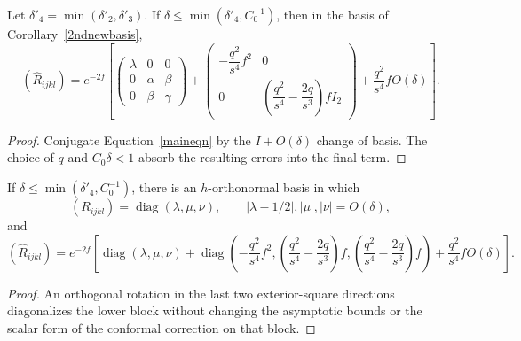 \begin{lemma}
\label{lem:rhat-matrix-adapted-basis}
\label{Rhatmatrix}
Let $\delta'_4=\min(\delta'_2,\delta'_3)$. If
$\delta\leq\min(\delta'_4,C_0^{-1})$, then in the basis of
Corollary~\ref{2ndnewbasis},
\[
(\widehat R_{ijkl})=e^{-2f}\left[
\begin{pmatrix}\lambda&0&0\\0&\alpha&\beta\\0&\beta&\gamma\end{pmatrix}
+\begin{pmatrix}
-\dfrac{q^2}{s^4}f^2&0\\
0&\left(\dfrac{q^2}{s^4}-\dfrac{2q}{s^3}\right)fI_2
\end{pmatrix}
+\frac{q^2}{s^4}fO(\delta)\right].
\]
\end{lemma}

\begin{proof}
\sketch
{}
Conjugate Equation~\eqref{maineqn} by the $I+O(\delta)$ change of basis.
The choice of $q$ and $C_0\delta<1$ absorb the resulting errors into the final
term.
\end{proof}

\begin{corollary}
\label{cor:diagonalized-curvature-matrices}
\label{13.10}
If $\delta\leq\min(\delta'_4,C_0^{-1})$, there is an $h$-orthonormal basis in
which
\[
  (R_{ijkl})=\operatorname{diag}(\lambda,\mu,\nu),
  \qquad
  |\lambda-1/2|,|\mu|,|\nu|=O(\delta),
\]
and
\[
  (\widehat R_{ijkl})=e^{-2f}\left[
  \operatorname{diag}(\lambda,\mu,\nu)
  +\operatorname{diag}\left(-\frac{q^2}{s^4}f^2,
  \left(\frac{q^2}{s^4}-\frac{2q}{s^3}\right)f,
  \left(\frac{q^2}{s^4}-\frac{2q}{s^3}\right)f\right)
  +\frac{q^2}{s^4}fO(\delta)\right].
\]
\end{corollary}

\begin{proof}
\sketch
{}
An orthogonal rotation in the last two exterior-square directions diagonalizes
the lower block without changing the asymptotic bounds or the scalar form of
the conformal correction on that block.
\end{proof}

